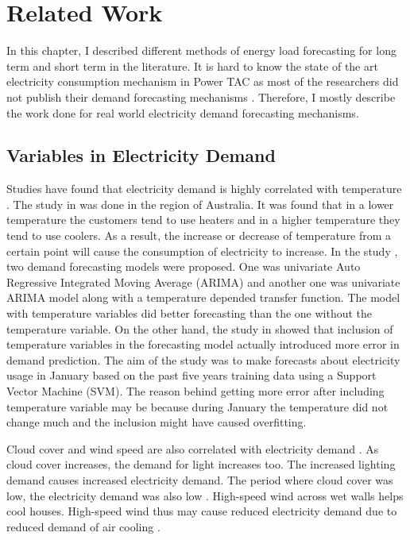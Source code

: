 
\chapter{Related Work}

In this chapter, I described different methods of energy load forecasting for long term and short term in the literature. It is hard to know the state of the art electricity consumption mechanism in Power TAC as most of the researchers did not publish their demand forecasting mechanisms \cite{liefers2014successful, ozdemir2015winner, serranofixing, ozdemir2015agentude}. Therefore, I mostly describe the work done for real world electricity demand forecasting mechanisms.   

\section{Variables in Electricity Demand}

Studies have found that electricity demand is highly correlated with temperature \cite{hor2005analyzing, hart2004weather, cho1995customer}. The study in \cite{hart2004weather} was done in the region of Australia.  It was found that in a lower temperature the customers tend to use heaters and in a higher temperature they tend to use coolers. As a result, the increase or decrease of temperature from a certain point will cause the consumption of electricity to increase. In the study \cite{cho1995customer}, two demand forecasting models were proposed. One was univariate Auto Regressive Integrated Moving Average (ARIMA) and another one was univariate ARIMA model along with a temperature depended transfer function. The model with temperature variables did better forecasting than the one without the temperature variable. On the other hand, the study in  \cite{chen2004load} showed that inclusion of temperature variables in the forecasting model actually introduced more error in demand prediction. The aim of the study was to make forecasts about electricity usage in January based on the past five years training data using a Support Vector Machine (SVM). The reason behind getting more error after including temperature variable may be because during January the temperature did not change much and the inclusion might have caused overfitting. 

Cloud cover and wind speed are also correlated with electricity demand \cite{hor2005analyzing, rudenauer2004energy}. As cloud cover increases, the demand for light increases too. The increased lighting demand causes increased electricity demand. The period where cloud cover was low, the electricity demand was also low \cite{hor2005analyzing}. High-speed wind across wet walls helps cool houses. High-speed wind thus may cause reduced electricity demand due to reduced demand of air cooling \cite{rudenauer2004energy}. 


